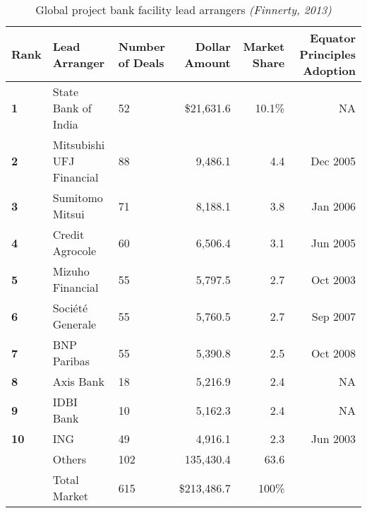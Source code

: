\begin{table*}[] \centering
\begin{small}
\begin{tabular}{@{}lllrrr@{}}\toprule
\textbf{Rank} & \textbf{Lead Arranger} & \textbf{Number of Deals} & \textbf{Dollar Amount} & \textbf{Market Share} & \textbf{Equator Principles Adoption}\\ \midrule
\textbf{1} & State Bank of India & 52 & \$21,631.6 & 10.1\% & NA\\ \hdashline
\textbf{2} & Mitsubishi UFJ Financial & 88 & 9,486.1 & 4.4 & Dec 2005\\ \hdashline
\textbf{3} & Sumitomo Mitsui & 71 & 8,188.1 & 3.8 & Jan 2006\\ \hdashline
\textbf{4} & Credit Agrocole & 60 & 6,506.4 & 3.1 & Jun 2005\\ \hdashline
\textbf{5} & Mizuho Financial & 55 & 5,797.5 & 2.7 & Oct 2003\\ \hdashline
\textbf{6} & Soci\'{e}t\'{e} Generale & 55 & 5,760.5 & 2.7 & Sep 2007\\ \hdashline
\textbf{7} & BNP Paribas & 55 & 5,390.8 & 2.5 & Oct 2008\\ \hdashline
\textbf{8} & Axis Bank & 18 & 5,216.9 & 2.4 & NA\\ \hdashline
\textbf{9} & IDBI Bank & 10 & 5,162.3 & 2.4 & NA\\ \hdashline
\textbf{10} & ING & 49 & 4,916.1 & 2.3 & Jun 2003\\ \midrule
 & Others & 102 & 135,430.4 & 63.6 & \\ \midrule
 & Total Market & 615 & \$213,486.7 & 100\% & \\
\bottomrule
\end{tabular}
\end{small}
\caption{Global project bank facility lead arrangers \emph{(Finnerty, 2013)}}
\end{table*}